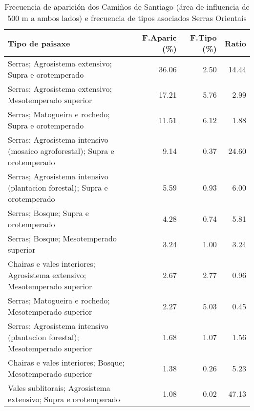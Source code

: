 \begin{table}[p]
\centering
\caption{Frecuencia de aparición dos Camiños de Santiago (área de influencia de 500 m a ambos lados) e frecuencia de tipos asociados Serras Orientais} 
\label{vcamino5}
\begin{tabular}{lrrr}
  \hline
Tipo de paisaxe & F.Aparic (\%) & F.Tipo (\%) & Ratio \\ 
  \hline
Serras; Agrosistema extensivo; Supra e orotemperado & 36.06 & 2.50 & 14.44 \\ 
  Serras; Agrosistema extensivo; Mesotemperado superior & 17.21 & 5.76 & 2.99 \\ 
  Serras; Matogueira e rochedo; Supra e orotemperado & 11.51 & 6.12 & 1.88 \\ 
  Serras; Agrosistema intensivo (mosaico agroforestal); Supra e orotemperado & 9.14 & 0.37 & 24.60 \\ 
  Serras; Agrosistema intensivo (plantacion forestal); Supra e orotemperado & 5.59 & 0.93 & 6.00 \\ 
  Serras; Bosque; Supra e orotemperado & 4.28 & 0.74 & 5.81 \\ 
  Serras; Bosque; Mesotemperado superior & 3.24 & 1.00 & 3.24 \\ 
  Chairas e vales interiores; Agrosistema extensivo; Mesotemperado superior & 2.67 & 2.77 & 0.96 \\ 
  Serras; Matogueira e rochedo; Mesotemperado superior & 2.27 & 5.03 & 0.45 \\ 
  Serras; Agrosistema intensivo (plantacion forestal); Mesotemperado superior & 1.68 & 1.07 & 1.56 \\ 
  Chairas e vales interiores; Bosque; Mesotemperado superior & 1.38 & 0.26 & 5.23 \\ 
  Vales sublitorais; Agrosistema extensivo; Supra e orotemperado & 1.08 & 0.02 & 47.13 \\ 
   \hline
\end{tabular}
\end{table}
